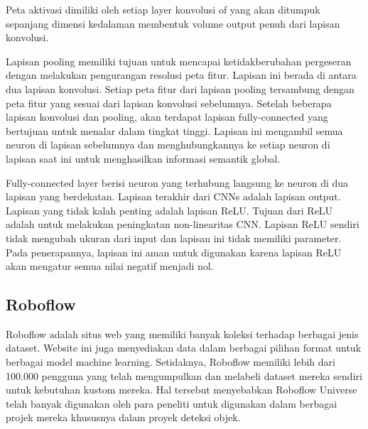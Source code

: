 Peta aktivasi dimiliki oleh setiap layer konvolusi of yang akan ditumpuk sepanjang dimensi kedalaman membentuk volume output penuh dari lapisan konvolusi\parencite{Keiron2015}.

Lapisan pooling memiliki tujuan untuk mencapai ketidakberubahan pergeseran dengan melakukan pengurangan resolusi peta fitur. Lapisan ini berada di antara dua lapisan konvolusi. Setiap peta fitur dari lapisan pooling tersambung dengan peta fitur yang sesuai dari lapisan konvolusi sebelumnya. Setelah beberapa lapisan konvolusi dan pooling, akan terdapat lapisan fully-connected yang bertujuan untuk menalar dalam tingkat tinggi. Lapisan ini mengambil semua neuron di lapisan sebelumnya dan menghubungkannya ke setiap neuron di lapisan saat ini untuk menghasilkan informasi semantik global\parencite{Jiuxiang2018}.

Fully-connected layer berisi neuron yang terhubung langsung ke neuron di dua lapisan yang berdekatan\parencite{Keiron2015}. Lapisan terakhir dari CNNs adalah lapisan output\parencite{Jiuxiang2018}. Lapisan yang tidak kalah penting adalah lapisan ReLU. Tujuan dari ReLU adalah untuk melakukan peningkatan non-linearitas CNN. Lapisan ReLU sendiri tidak mengubah ukuran dari input dan lapisan ini tidak memiliki parameter. Pada penerapannya, lapisan ini aman untuk digunakan karena lapisan ReLU akan mengatur semua nilai negatif menjadi nol\parencite{Wu2017}.

\subsection{Roboflow}
Roboflow adalah situs web yang memiliki banyak koleksi terhadap berbagai jenis dataset. Website ini juga menyediakan data dalam berbagai pilihan format untuk berbagai model machine learning\parencite{Deepa2023}. Setidaknya, Roboflow memiliki lebih dari 100.000 pengguna yang telah mengumpulkan dan melabeli dataset mereka sendiri untuk kebutuhan kustom mereka. Hal tersebut menyebabkan Roboflow Universe telah banyak digunakan oleh para peneliti untuk digunakan dalam berbagai projek mereka khususnya dalam proyek deteksi objek\parencite{ciaglia2022}.


